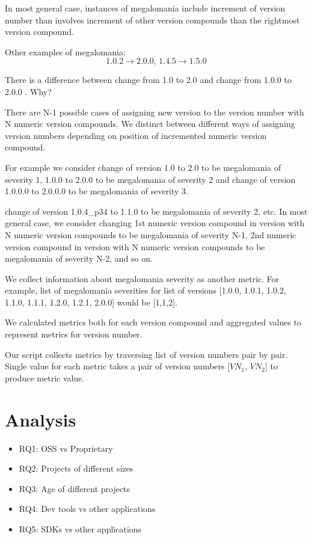 \documentclass[conference]{IEEEtran}
\begin{document}
In most general case, instances of megalomania include increment of version number than involves increment of other version compounds than the rightmost version compound.

Other examples of megalomania: $$ 1.0.2 \rightarrow 2.0.0 \texttt{, } 1.4.5 \rightarrow 1.5.0 $$

There is a difference between change from 1.0 to 2.0 and change from 1.0.0 to 2.0.0 . Why? 

There are N-1 possible cases of assigning new version to the version number with N numeric version compounds. We distinct between different ways of assigning version numbers depending on position of incremented numeric version compound. 

For example we consider change of version 1.0 to 2.0 to be megalomania of severity 1, 1.0.0 to 2.0.0 to be megalomania of severity 2 and change of version 1.0.0.0 to 2.0.0.0 to be megalomania of severity 3.

change of version 1.0.4\_p34 to 1.1.0 to be megalomania of severity 2, etc. In most general case, we consider changing 1st numeric version compound in version with N numeric version compounds to be megalomania of severity N-1, 2nd numeric version compound in version with N numeric version compounds to be megalomania of severity N-2, and so on. 

We collect information about megalomania severity as another metric. For example, list of megalomania severities for list of versions [1.0.0, 1.0.1, 1.0.2, 1.1.0, 1.1.1, 1.2.0, 1.2.1, 2.0.0] would be [1,1,2].

We calculated metrics both for each version compound and aggregated values to represent metrics for  version number.

Our script collects metrics by traversing list of version numbers pair by pair. Single value for each metric takes a pair of version numbers [$VN_{1}$, $VN_{2}$] to produce metric value.

\section{Analysis}

\begin{itemize}
\item RQ1: OSS vs Proprietary
\item RQ2: Projects of different sizes
\item RQ3: Age of different projects
\item RQ4: Dev tools vs other applications
\item RQ5: SDKs vs other applications 
\end{itemize}
\end{document}
